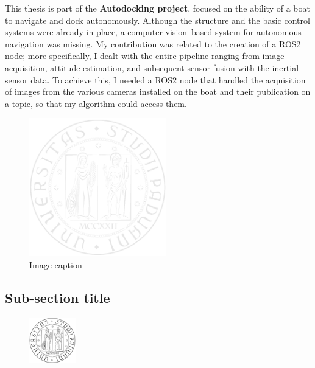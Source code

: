\documentclass[a4paper,12pt,twoside,openright]{book}
\begin{document}
This thesis is part of the \textbf{Autodocking project}, focused on the ability of a boat to navigate and dock autonomously. Although the structure and the basic control systems were already in place, a computer vision–based system for autonomous navigation was missing. My contribution was related to the creation of a ROS2 node; more specifically, I dealt with the entire pipeline ranging from image acquisition, attitude estimation, and subsequent sensor fusion with the inertial sensor data. To achieve this, I needed a ROS2 node that handled the acquisition of images from the various cameras installed on the boat and their publication on a topic, so that my algorithm could access them.







\begin{figure}[ht]
  \centering
  \includegraphics[height=6cm]{images/unipd-light}
  \caption{Image caption}\label{unipd-logo}
\end{figure}

\subsection{Sub-section title}
\begin{figure}
  \vspace{-20pt}
  \begin{center}
  \includegraphics[width=2cm]{images/unipd-bn}
  \end{center}
  \vspace{-10pt}
\end{figure}
\end{document}
